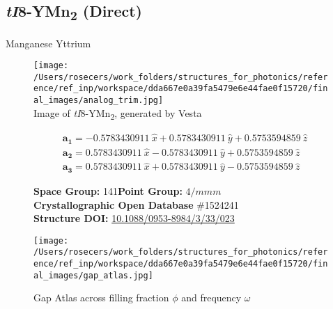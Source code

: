 \subsection{\large{\textit{tI}8-YMn\textsubscript{2} (Direct)}}\vspace{-0.1in}
Manganese Yttrium


\begin{figure}[H]
\begin{minipage}{0.34\textwidth}\centering
\texttt{[image: /Users/rosecers/work\_folders/structures\_for\_photonics/reference/ref\_inp/workspace/dda667e0a39fa5479e6e44fae0f15720/final\_images/analog\_trim.jpg]}\\
\small{Image of \textit{tI}8-YMn\textsubscript{2}, generated by Vesta}
\end{minipage}\hfill
\begin{minipage}{0.65\textwidth}\raggedright
{\setlength{\mathindent}{0cm}
\begin{equation*}
\begin{split}&\boldsymbol{a_1} = -0.5783430911\ \hat{x} + 0.5783430911\ \hat{y} + 0.5753594859\ \hat{z}\\[-8pt]
&\boldsymbol{a_2} = 0.5783430911\ \hat{x} - 0.5783430911\ \hat{y} + 0.5753594859\ \hat{z}\\[-8pt]
&\boldsymbol{a_3} = 0.5783430911\ \hat{x} + 0.5783430911\ \hat{y} - 0.5753594859\ \hat{z}
\end{split}
\end{equation*}}

\textbf{Space Group:}	141\hspace{0.5in}\textbf{Point Group:}	$4/mmm$\\
\textbf{Crystallographic Open Database} \#1524241\\
\textbf{Structure DOI: }\url{10.1088/0953-8984/3/33/023}

\end{minipage}\hfill
\end{figure}
\vspace{-0.25in}


\begin{figure}[H]
\begin{minipage}{0.9\textwidth}\centering
\texttt{[image: /Users/rosecers/work\_folders/structures\_for\_photonics/reference/ref\_inp/workspace/dda667e0a39fa5479e6e44fae0f15720/final\_images/gap\_atlas.jpg]}
\\
\end{minipage}\hfill\caption{Gap Atlas across filling fraction $\phi$ and frequency $\omega$}
\end{figure}


